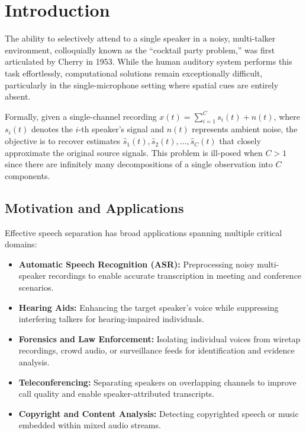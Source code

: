\documentclass[conference]{IEEEtran}
\begin{document}
\section{Introduction}
\label{sec:intro}

The ability to selectively attend to a single speaker in a noisy, multi-talker environment, colloquially known as the ``cocktail party problem,'' was first articulated by Cherry in 1953. While the human auditory system performs this task effortlessly, computational solutions remain exceptionally difficult, particularly in the single-microphone setting where spatial cues are entirely absent.

Formally, given a single-channel recording $x(t) = \sum_{i=1}^{C} s_i(t) + n(t)$, where $s_i(t)$ denotes the $i$-th speaker's signal and $n(t)$ represents ambient noise, the objective is to recover estimates $\hat{s}_1(t), \hat{s}_2(t), \ldots, \hat{s}_C(t)$ that closely approximate the original source signals. This problem is ill-posed when $C > 1$ since there are infinitely many decompositions of a single observation into $C$ components.

\subsection{Motivation and Applications}

Effective speech separation has broad applications spanning multiple critical domains:

\begin{itemize}[leftmargin=*,nosep]
    \item \textbf{Automatic Speech Recognition (ASR):} Preprocessing noisy multi-speaker recordings to enable accurate transcription in meeting and conference scenarios.
    \item \textbf{Hearing Aids:} Enhancing the target speaker's voice while suppressing interfering talkers for hearing-impaired individuals.
    \item \textbf{Forensics and Law Enforcement:} Isolating individual voices from wiretap recordings, crowd audio, or surveillance feeds for identification and evidence analysis.
    \item \textbf{Teleconferencing:} Separating speakers on overlapping channels to improve call quality and enable speaker-attributed transcripts.
    \item \textbf{Copyright and Content Analysis:} Detecting copyrighted speech or music embedded within mixed audio streams.
\end{itemize}
\end{document}
